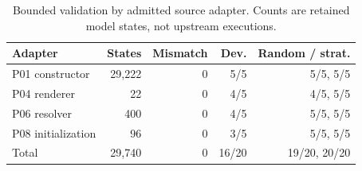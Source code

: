 \begin{table}[t]
\caption{Bounded validation by admitted source adapter. Counts are retained model states, not upstream executions.}\label{tab:adapter-cases}
\centering
\begin{tabular}{lrrrr}
\toprule
Adapter & States & Mismatch & Dev. & Random / strat.\\\midrule
P01 constructor & 29,222 & 0 & 5/5 & 5/5, 5/5\\
P04 renderer & 22 & 0 & 4/5 & 4/5, 5/5\\
P06 resolver & 400 & 0 & 4/5 & 5/5, 5/5\\
P08 initialization & 96 & 0 & 3/5 & 5/5, 5/5\\
Total & 29,740 & 0 & 16/20 & 19/20, 20/20\\
\bottomrule
\end{tabular}
\end{table}
